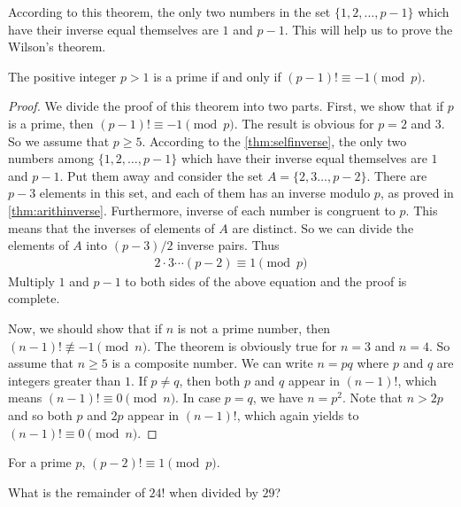 \documentclass{subfile}
\begin{document}
	According to this theorem, the only two numbers in the set $\{1, 2, \ldots, p-1\}$ which have their inverse equal themselves are $1$ and $p-1$. This will help us to prove the Wilson's theorem.
		\begin{theorem}
			The positive integer $p>1$ is a prime if and only if $(p-1)! \equiv -1 \pmod p$.
		\end{theorem}

		\begin{proof}
			We divide the proof of this theorem into two parts. First, we show that if $p$ is a prime, then $(p-1)! \equiv -1 \pmod p$.
			The result is obvious for $p=2$ and $3$. So we assume that $p \geq 5$. According to the \autoref{thm:selfinverse}, the only two numbers among  $\{1, 2, \ldots, p-1\}$ which have their inverse equal themselves are $1$ and $p-1$. Put them away and consider the set  $A=\{2, 3 \ldots, p-2\}$. There are $p-3$ elements in this set, and each of them has an inverse modulo $p$, as proved in \autoref{thm:arithinverse}. Furthermore, inverse of each number is congruent to $p$. This means that the inverses of elements of $A$ are distinct. So we can divide the elements of $A$ into $(p-3)/2$ inverse pairs. Thus
			\begin{align*}
			2 \cdot 3  \cdots  (p-2) \equiv 1 \pmod p
			\end{align*}
			Multiply $1$ and $p-1$ to both sides of the above equation and the proof is complete.

			Now, we should show that if $n$ is not a prime number, then $(n-1)! \not \equiv -1 \pmod n$.
			The theorem is obviously true for $n=3$ and $n=4$. So assume that $n \geq 5$ is a composite number. We can write $n=pq$ where $p$ and $q$ are integers greater than $1$. If $p \neq q$, then both $p$ and $q$ appear in $(n-1)!$, which means $(n-1)! \equiv 0 \pmod n$. In case $p=q$, we have $n=p^2$. Note that $n>2p$ and so both $p$ and $2p$ appear in $(n-1)!$, which again yields to $(n-1)! \equiv 0 \pmod n$.
		\end{proof}

		\begin{corollary}
			For a prime $p$, $(p-2)! \equiv 1 \pmod p$.
		\end{corollary}

		\begin{problem}
			What is the remainder of $24!$ when divided by $29$?
		\end{problem}
\end{document}

